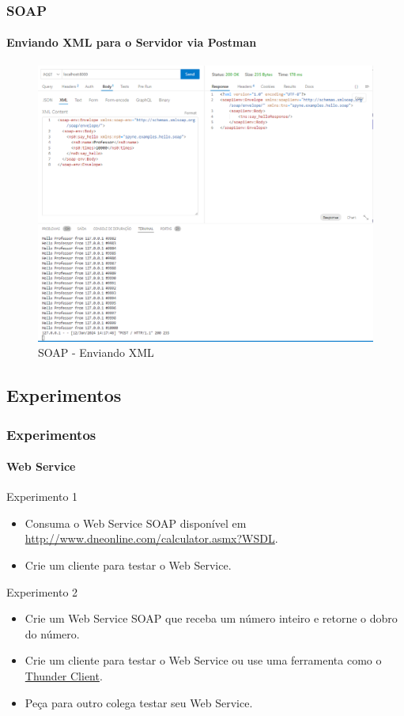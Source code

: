\documentclass[
	9pt, %
	t, %
]{beamer}
\begin{document}
\begin{frame}[fragile]
	\frametitle{SOAP}
	\framesubtitle{Enviando XML para o Servidor via Postman}
	
	\begin{figure}
		\includegraphics[width=0.7\linewidth]{soap_http_request_example.PNG}
		\caption{SOAP - Enviando XML}
		\label{fig:soap_server_xml_2}
	\end{figure}

\end{frame}

\subsection{Experimentos}

\begin{frame}
	\frametitle{Experimentos}
	\framesubtitle{Web Service}

	\begin{block}{Experimento 1}
		\begin{itemize}
			\item Consuma o Web Service SOAP disponível em \url{http://www.dneonline.com/calculator.asmx?WSDL}.
			\item Crie um cliente para testar o Web Service.
		\end{itemize}
	\end{block}
	
	\begin{block}{Experimento 2}
		\begin{itemize}
			\item Crie um Web Service SOAP que receba um número inteiro e retorne o dobro do número.
			\item Crie um cliente para testar o Web Service ou use uma ferramenta como o \href{https://www.thunderclient.com/}{Thunder Client}.
			\item Peça para outro colega testar seu Web Service.
		\end{itemize}
	\end{block}

\end{frame}
\end{document}
